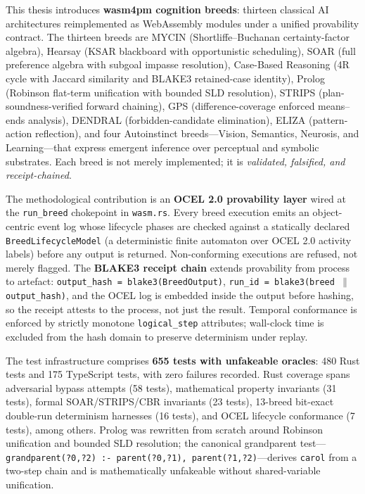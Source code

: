 \medskip
\noindent
This thesis introduces \textbf{wasm4pm cognition breeds}: thirteen classical AI
architectures reimplemented as WebAssembly modules under a unified provability
contract.
The thirteen breeds are MYCIN (Shortliffe--Buchanan certainty-factor algebra),
Hearsay (KSAR blackboard with opportunistic scheduling), SOAR (full preference
algebra with subgoal impasse resolution), Case-Based Reasoning (4R cycle with
Jaccard similarity and BLAKE3 retained-case identity), Prolog (Robinson flat-term
unification with bounded SLD resolution), STRIPS (plan-soundness-verified forward
chaining), GPS (difference-coverage enforced means--ends analysis), DENDRAL
(forbidden-candidate elimination), ELIZA (pattern-action reflection), and four
Autoinstinct breeds---Vision, Semantics, Neurosis, and Learning---that express
emergent inference over perceptual and symbolic substrates.
Each breed is not merely implemented; it is \emph{validated, falsified, and
receipt-chained}.

\medskip
\noindent
The methodological contribution is an \textbf{OCEL 2.0 provability layer} wired at
the \texttt{run\_breed} chokepoint in \texttt{wasm.rs}.
Every breed execution emits an object-centric event log whose lifecycle phases are
checked against a statically declared \texttt{BreedLifecycleModel} (a deterministic
finite automaton over OCEL 2.0 activity labels) before any output is returned.
Non-conforming executions are refused, not merely flagged.
The \textbf{BLAKE3 receipt chain} extends provability from process to artefact:
\texttt{output\_hash = blake3(BreedOutput)}, \texttt{run\_id = blake3(breed
$\|$ output\_hash)}, and the OCEL log is embedded inside the output before hashing,
so the receipt attests to the process, not just the result.
Temporal conformance is enforced by strictly monotone \texttt{logical\_step}
attributes; wall-clock time is excluded from the hash domain to preserve
determinism under replay.

\medskip
\noindent
The test infrastructure comprises \textbf{655 tests with unfakeable oracles}:
480 Rust tests and 175 TypeScript tests, with zero failures recorded.
Rust coverage spans adversarial bypass attempts (58 tests), mathematical property
invariants (31 tests), formal SOAR/STRIPS/CBR invariants (23 tests), 13-breed
bit-exact double-run determinism harnesses (16 tests), and OCEL lifecycle
conformance (7 tests), among others.
Prolog was rewritten from scratch around Robinson unification and bounded SLD
resolution; the canonical grandparent test---\texttt{grandparent(?0,?2) :-
parent(?0,?1), parent(?1,?2)}---derives \texttt{carol} from a two-step chain and
is mathematically unfakeable without shared-variable unification.

